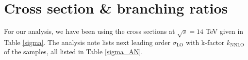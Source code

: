 \documentclass[10pt,a4paper]{article}
\renewcommand{\tt}{$\text{t}\bar{\text{t}}$}
\newcommand{\BR}{\mathcal{B}}
\begin{document}
\section{Cross section \& branching ratios}

For our analysis, we have been using the cross sections at $\sqrt{s}=14$ TeV given in Table \ref{sigma}. The analysis note lists next leading order $\sigma_\text{LO}$ with k-factor $k_\text{NNLO}$ of the samples, all listed in Table \ref{sigma_AN}. %
\end{document}
